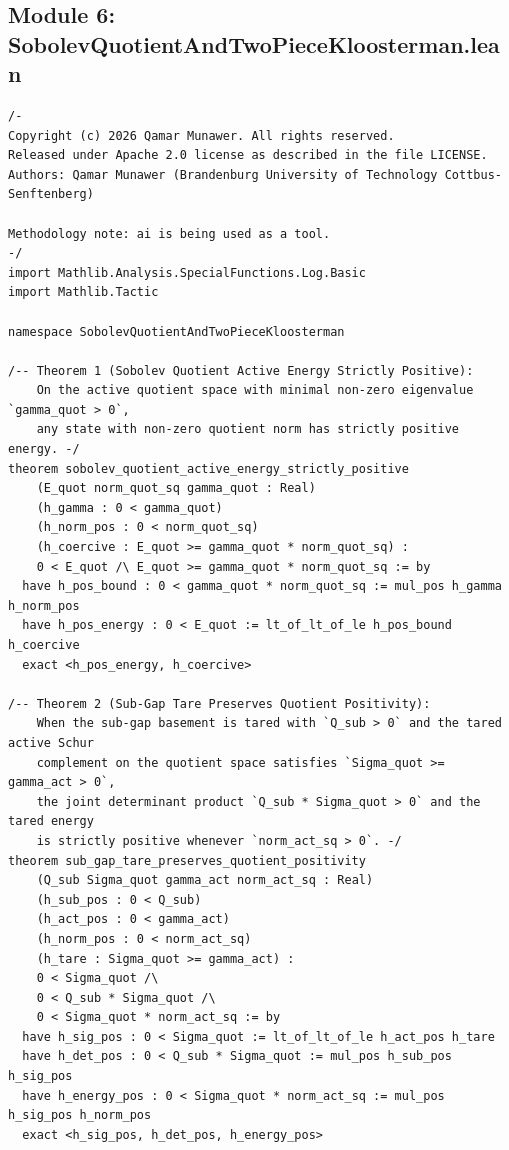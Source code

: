 \documentclass[11pt,a4paper]{article}
\begin{document}
\subsection{Module 6: SobolevQuotientAndTwoPieceKloosterman.lean}
\begin{lstlisting}[language=Lean4]
/-
Copyright (c) 2026 Qamar Munawer. All rights reserved.
Released under Apache 2.0 license as described in the file LICENSE.
Authors: Qamar Munawer (Brandenburg University of Technology Cottbus-Senftenberg)

Methodology note: ai is being used as a tool.
-/
import Mathlib.Analysis.SpecialFunctions.Log.Basic
import Mathlib.Tactic

namespace SobolevQuotientAndTwoPieceKloosterman

/-- Theorem 1 (Sobolev Quotient Active Energy Strictly Positive):
    On the active quotient space with minimal non-zero eigenvalue `gamma_quot > 0`,
    any state with non-zero quotient norm has strictly positive energy. -/
theorem sobolev_quotient_active_energy_strictly_positive
    (E_quot norm_quot_sq gamma_quot : Real)
    (h_gamma : 0 < gamma_quot)
    (h_norm_pos : 0 < norm_quot_sq)
    (h_coercive : E_quot >= gamma_quot * norm_quot_sq) :
    0 < E_quot /\ E_quot >= gamma_quot * norm_quot_sq := by
  have h_pos_bound : 0 < gamma_quot * norm_quot_sq := mul_pos h_gamma h_norm_pos
  have h_pos_energy : 0 < E_quot := lt_of_lt_of_le h_pos_bound h_coercive
  exact <h_pos_energy, h_coercive>

/-- Theorem 2 (Sub-Gap Tare Preserves Quotient Positivity):
    When the sub-gap basement is tared with `Q_sub > 0` and the tared active Schur
    complement on the quotient space satisfies `Sigma_quot >= gamma_act > 0`,
    the joint determinant product `Q_sub * Sigma_quot > 0` and the tared energy
    is strictly positive whenever `norm_act_sq > 0`. -/
theorem sub_gap_tare_preserves_quotient_positivity
    (Q_sub Sigma_quot gamma_act norm_act_sq : Real)
    (h_sub_pos : 0 < Q_sub)
    (h_act_pos : 0 < gamma_act)
    (h_norm_pos : 0 < norm_act_sq)
    (h_tare : Sigma_quot >= gamma_act) :
    0 < Sigma_quot /\
    0 < Q_sub * Sigma_quot /\
    0 < Sigma_quot * norm_act_sq := by
  have h_sig_pos : 0 < Sigma_quot := lt_of_lt_of_le h_act_pos h_tare
  have h_det_pos : 0 < Q_sub * Sigma_quot := mul_pos h_sub_pos h_sig_pos
  have h_energy_pos : 0 < Sigma_quot * norm_act_sq := mul_pos h_sig_pos h_norm_pos
  exact <h_sig_pos, h_det_pos, h_energy_pos>


\end{lstlisting}
\end{document}
